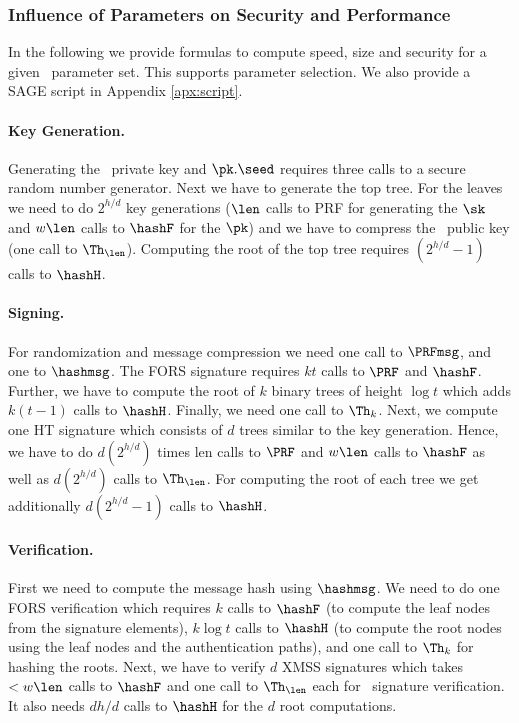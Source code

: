\subsubsection{Influence of Parameters on Security and Performance} \label{sec:securityandperformance}

In the following we provide formulas to compute speed, size and security for a given \SPHINCSA\ parameter set. This supports parameter selection. We also provide a SAGE script in Appendix \ref{apx:script}.
 

\paragraph{Key Generation.} 
Generating the \SPHINCSA\ private key and $\pk.\seed$ requires three calls to a secure random number generator. Next we have to generate the top tree. For the leaves we need to do $2^{h/d}$ \WOTSCS key generations ($\len$ calls to PRF for generating the $\sk$ and $w \len$ calls to $\hashF$ for the $\pk$) and we have to compress the \WOTSCS\ public key (one call to $\Th_{\len}$). Computing the root of the top tree requires $(2^{h/d}-1)$ calls to $\hashH$.

\paragraph{Signing.}
For randomization and message compression we need one call to $\PRFmsg$, and one to $\hashmsg$. The FORS signature requires $kt$ calls to $\PRF$ and $\hashF$. Further, we have to compute the root of $k$ binary trees of height $\log t$ which adds $k(t-1)$ calls to $\hashH$. Finally, we need one call to $\Th_{k}$. Next, we compute one HT signature which consists of $d$ trees similar to the key generation. Hence, we have to do $d(2^{h/d})$ times len calls to $\PRF$ and $w \len$ calls to $\hashF$ as well as $d(2^{h/d})$ calls to $\Th_{\len}$. For computing the root of each tree we get additionally $d(2^{h/d}-1)$ calls to $\hashH$.

\paragraph{Verification.}
First we need to compute the message hash using $\hashmsg$. We need to do one FORS verification which requires $k$ calls to $\hashF$ (to compute the leaf nodes from the signature elements), $k\log t$ calls to $\hashH$ (to compute the root nodes using the leaf nodes and the authentication paths), and one call to $\Th_{k}$ for hashing the roots. Next, we have to verify $d$ XMSS signatures which takes $< w \len$ calls to $\hashF$ and one call to $\Th_{\len}$ each for \WOTSCS\ signature verification\footnotemark. It also needs $dh/d$ calls to $\hashH$ for the $d$ root computations.

